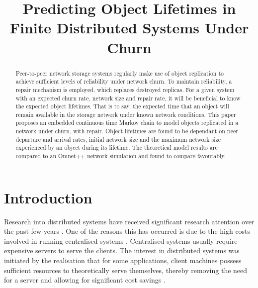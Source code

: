 \documentclass[10pt,a4paper,conference]{IEEEtran}
\begin{document}
%
\title{Predicting Object Lifetimes in Finite Distributed Systems Under Churn}

\author{}

\maketitle

\begin{abstract}
Peer-to-peer network storage systems regularly make use of object replication to achieve sufficient levels of reliability under network churn. To maintain reliability, a repair mechanism is employed, which replaces destroyed replicas. For a given system with an expected churn rate, network size and repair rate, it will be beneficial to know the expected object lifetimes. That is to say, the expected time that an object will remain available in the storage network under known network conditions. This paper proposes an embedded continuous time Markov chain to model objects replicated in a network under churn, with repair. Object lifetimes are found to be dependant on peer departure and arrival rates, initial network size and the maximum network size experienced by an object during its lifetime. The theoretical model results are compared to an Omnet++ network simulation and found to compare favourably.
\end{abstract}

\section{Introduction}
\label{introduction}

Research into distributed systems have received significant research attention over the past few years \cite{}. One of the reasons this has occurred is due to the high costs involved in running centralised systems \cite{}. Centralised systems usually require expensive servers to serve the clients. The interest in distributed systems was initiated by the realisation that for some applications, client machines possess sufficient resources to theoretically serve themselves, thereby removing the need for a server and allowing for significant cost savings \cite{}.
\end{document}
